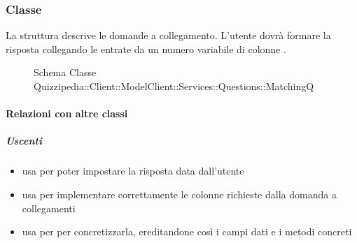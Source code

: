 \subsubsection{Classe }
La struttura descrive le domande a collegamento. L'utente dovrà formare la risposta collegando le entrate da un numero variabile di colonne .
\begin{figure}[H]
\centering
\noindent{}
\caption[Schema Classe MatchingQ]{Schema Classe Quizzipedia::Client::ModelClient::Services::Questions::MatchingQ}
\end{figure}
\paragraph{Relazioni con altre classi}
\subparagraph{Uscenti}
\begin{itemize}
\item usa  per poter impostare la risposta data dall'utente
\item usa  per implementare correttamente le colonne richieste dalla domanda a collegamenti
\item usa  per per concretizzarla, ereditandone così i campi dati e i metodi concreti
\end{itemize}
